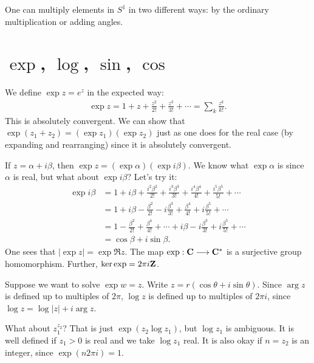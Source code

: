 \documentclass[11pt, oneside,margin=1in]{article}
\begin{document}
One can multiply elements in $S^1$ in two different ways: by the ordinary multiplication or adding angles.\fi
\section{$\exp$, $\log$, $\sin$, $\cos$}
We define $\exp z = e^z$ in the expected way: \begin{align*}
	\exp z = 1 + z + \frac{z^2}{2!} + \frac{z^3}{3!}+\cdots = \sum_{k}^{} \frac{z^k}{k!} .
\end{align*}
This is absolutely convergent. We can show that $\exp (z_1 + z_2) =(\exp z_1) (\exp z_2)$ just as one does for the real case (by expanding and rearranging) since it is absolutely convergent.

If $z= \alpha+i\beta$, then $\exp z = (\exp \alpha) (\exp i\beta)$. We know what $\exp \alpha$ is since $\alpha$ is real, but what about $\exp i\beta$? Let's try it:
\begin{align*}
	\exp i\beta &= 1 + i\beta + \frac{i^2\beta^2}{2!} + \frac{i^3\beta^3}{3!} + \frac{i^4\beta^4}{4!} + \frac{i^5\beta^5}{5!} + \cdots\\
		    &= 1 + i\beta - \frac{\beta^2}{2!} - i \frac{\beta^3}{3!} + \frac{\beta^4}{4!} + i \frac{\beta^5}{5!} + \cdots\\
		    &= 1 - \frac{\beta^2}{2!} + \frac{\beta^4}{4!} +\cdots + i\beta - i \frac{\beta^3}{3!} + i\frac{\beta^5}{5!} + \cdots\\
		    &= \cos \beta + i \sin \beta.
\end{align*}
One sees that $\left\lvert \exp z \right\rvert = \exp \Re z$. The map $\exp : \mathbf C \longrightarrow \mathbf C^*$ is a surjective group homomorphism. Further, $\ker \exp = 2\pi i\mathbf Z$.

Suppose we want to solve $\exp w = z$. Write $z = r(\cos\theta + i\sin\theta)$. Since $\arg z$ is defined up to multiples of $2\pi$, $\log z$ is defined up to multiples of $2\pi i$, since $\log z = \log \left\lvert z \right\rvert + i\arg z$. 

What about $z_1^{z_2}$? That is just $\exp(z_2\log z_1)$, but $\log z_1$ is ambiguous. It is well defined if $z_1>0$ is real and we take $\log z_1$ real. It is also okay if $n=z_2$ is an integer, since $\exp(n 2\pi i)=1$.
\end{document}
